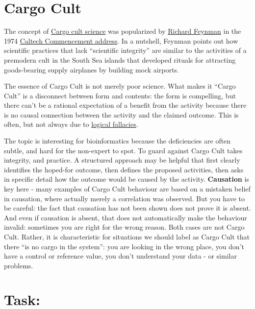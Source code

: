 \documentclass[]{book}
\begin{document}
\section{Cargo Cult}\label{cargo-cult}

The concept of
\href{https://en.wikipedia.org/wiki/Cargo_cult_science}{Cargo cult
science} was popularized by
\href{https://en.wikipedia.org/wiki/Richard_Feynman}{Richard Feynman} in
the 1974
\href{http://calteches.library.caltech.edu/51/2/CargoCult.htm}{Caltech
Commencement address}. In a nutshell, Feynman points out how scientific
practices that lack ``scientific integrity'' are similar to the
activities of a premodern cult in the South Sea islands that developed
rituals for attracting goods-bearing supply airplanes by building mock
airports.

The essence of Cargo Cult is not merely poor science. What makes it
``Cargo Cult'' is a disconnect between form and contents: the form is
compelling, but there can't be a rational expectation of a benefit from
the activity because there is no causal connection between the activity
and the claimed outcome. This is often, but not always due to
\href{https://en.wikipedia.org/wiki/List_of_fallacies}{logical
fallacies}.

The topic is interesting for bioinformatics because the deficiencies are
often subtle, and hard for the non-expert to spot. To guard against
Cargo Cult takes integrity, and practice. A structured approach may be
helpful that first clearly identifies the hoped-for outcome, then
defines the proposed activities, then asks in specific detail how the
outcome would be caused by the activity. \textbf{Causation} is key here
- many examples of Cargo Cult behaviour are based on a mistaken belief
in causation, where actually merely a correlation was observed. But you
have to be careful: the fact that causation has not been shown does not
prove it is absent. And even if causation is absent, that does not
automatically make the behaviour invalid: sometimes you are right for
the wrong reason. Both cases are not Cargo Cult. Rather, it is
characteristic for situations we should label as Cargo Cult that there
``is no cargo in the system'': you are looking in the wrong place, you
don't have a control or reference value, you don't understand your data
- or similar problems.

\section{Task:}\label{task-4}
\end{document}
